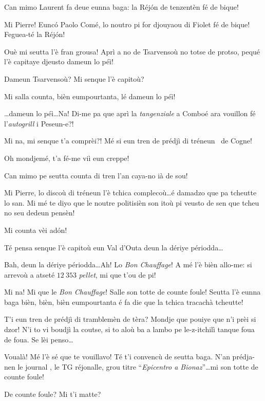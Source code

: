 \begin{drama}
\Pierrespeaks Can mimo Laurent fa deue eunna baga: la Réj\'on de tenzentèn fé de bique!

\Laurentspeaks Mi Pierre! Eunc\'o Paolo Comé, lo noutro pi for djouyaou di Fiolet fé de bique! Feguea-té la Réj\'on!

\Pierrespeaks Ouè mi seutta l'è fran grousa! Aprì a no de Tsarvensoù no totse de protso, pequé l'è capitaye djeusto dameun lo péì!

\Laurentspeaks Dameun Tsarvensoù? Mi senque l'è capitoù?

\Pierrespeaks Mi salla counta, bièn eumpourtanta, lé dameun lo péì!

\Laurentspeaks \ldots dameun lo péì\ldots Na! Di-me pa que aprì la \textit{tangenziale} a Comboé ara vouillon fé l'\textit{autogrill} i Peseun-e?!

\Pierrespeaks Mi na, mi senque t'a comprèi?! Mé si eun tren de prédjì di tréneun \tren\ de Cogne!

\Laurentspeaks Oh mondjemé, t'a fé-me viì eun creppe!

\Pierrespeaks Can mimo pe seutta counta di tren l'an caya-no ià de sou! 

\Laurentspeaks Mi Pierre, lo discoù di tréneun l'è tchica complecoù\ldots é damadzo que pa tcheutte lo san. Mi mé te diyo que le noutre politisièn son itoù pi veusto de sen que tcheu no seu dedeun pensèn! 

\Pierrespeaks Mi counta vèi ad\'on!

\Laurentspeaks Té pensa senque l'è capitoù eun Val d'Outa deun la dériye périodda\ldots

\Pierrespeaks Bah, deun la dériye périodda\ldots Ah! Lo \textit{Bon Chauffage}! A mé l'è bièn allo-me: si arrevoù a atseté $12\ 353$ \textit{pellet}, mi que t'ou de pi!

\Laurentspeaks Mi na! Mi que le \textit{Bon Chauffage}! Salle son totte de counte foule! Seutta l'è eunna baga bièn, bièn, bièn eumpourtanta é fa die que la tchica tracachà tcheutte!

\Pierrespeaks T'i eun tren de prédjì di tramblemèn de tèra? Mondje que pouiye que n'i prèi si dzor! N'i to vi boudjì la coutse, si to aloù ba a lambo pe le-z-itchilì tanque foua de foua. Se lèi penso\ldots

\Laurentspeaks Voualà! Mé l'è sé que te vouillavo! Té t'i convencù de seutta baga. N'an prédja-nen le journal \journal , le TG réjonalle, grou titre ``\textit{Epicentro a Bionaz}''\ldots mi son totte de counte foule!

\Pierrespeaks De counte foule? Mi t'i matte?


\end{drama}
